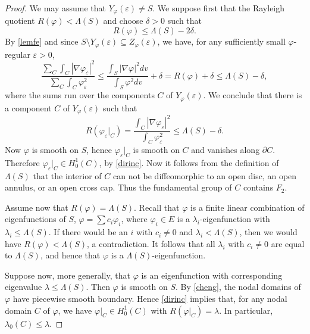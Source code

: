 \begin{proof}
We may assume that $Y_{\varphi}({\varepsilon})\ne S$.
We suppose first that the Rayleigh quotient $R({\varphi})<\Lambda(S)$
and choose $\delta > 0$ such that
\begin{equation}\label{strict}
  R({\varphi}) \le \Lambda(S) - 2\delta.
\end{equation}
By \cref{lemfe} and since $S\setminus Y_{\varphi}({\varepsilon})\subseteq Z_{\varphi}({\varepsilon})$, we have,
for any sufficiently small ${\varphi}$-regular ${\varepsilon}>0$,
\begin{equation}\label{strict2}
   \frac{\sum_C\int_C|\nabla{\varphi}_{\varepsilon}|^2}{\sum_C\int_C{\varphi}_{\varepsilon}^2}
   \le \frac{\int_S|\nabla{\varphi}|^2 dv}{\int_S{\varphi}^2 dv} + \delta
   = R({\varphi}) + \delta
   \leq \Lambda(S) - \delta,
\end{equation}
where the sums run over the components $C$ of $Y_{\varphi}({\varepsilon})$.
We conclude that there is a component $C$ of $Y_{\varphi}({\varepsilon})$ such that
\begin{equation}\label{strict4}
   R({\varphi}_{\varepsilon}|_C)
   = \frac{\int_C|\nabla{\varphi}_{\varepsilon}|^2}{\int_C{\varphi}_{\varepsilon}^2}
   \leq \Lambda(S) - \delta.
\end{equation}
Now ${\varphi}$ is smooth on $S$,
hence ${\varphi}_{\varepsilon}|_C$ is smooth on $C$ and vanishes along $\partial C$.
Therefore ${\varphi}_{\varepsilon}|_C\in H^1_0(C)$, by \cref{dirinc}.
Now it follows from the definition of $\Lambda(S)$ that the interior of $C$
can not be diffeomorphic to an open disc, an open annulus, or an open cross cap.
Thus the fundamental group of $C$ contains $F_2$.

Assume now that $R({\varphi})=\Lambda(S)$.
Recall that ${\varphi}$ is a finite linear combination of eigenfunctions of $S$,
${\varphi} = \sum  c_i{\varphi}_i$,
where ${\varphi}_i\in E$ is a $\lambda_i$-eigenfunction with $\lambda_i\le\Lambda(S)$.
If there would be an $i$ with $c_i\ne0$ and $\lambda_i<\Lambda(S)$,
then we would have $R({\varphi})<\Lambda(S)$, a contradiction.
It follows that all $\lambda_i$ with $c_i\ne0$ are equal to $\Lambda(S)$,
and hence that ${\varphi}$ is a $\Lambda(S)$-eigenfunction.

Suppose now, more generally, that ${\varphi}$ is an eigenfunction
with corresponding eigenvalue $\lambda\le\Lambda(S)$.
Then ${\varphi}$ is smooth on $S$.
By \cref{cheng}, the nodal domains of ${\varphi}$ have piecewise smooth boundary.
Hence \cref{dirinc} implies that, for any nodal domain $C$ of ${\varphi}$,
we have ${\varphi}|_C\in H^1_0(C)$ with $R({\varphi}|_C)=\lambda$.
In particular, $\lambda_0(C)\le\lambda$.


\end{proof}
